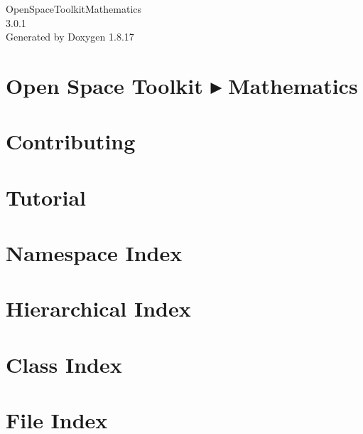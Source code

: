 \let\mypdfximage\pdfximage\def\pdfximage{\immediate\mypdfximage}\documentclass[twoside]{book}
\newcommand{\+}{\discretionary{\mbox{\scriptsize$\hookleftarrow$}}{}{}}
\newcommand{\clearemptydoublepage}{%
  \newpage{\pagestyle{empty}\cleardoublepage}%
}
\begin{document}
\hypersetup{pageanchor=false,
             bookmarksnumbered=true,
             pdfencoding=unicode
            }
\begin{titlepage}
\vspace*{7cm}
\begin{center}%
{\Large Open\+Space\+Toolkit\+Mathematics \\[1ex]\large 3.\+0.\+1 }\\
\vspace*{1cm}
{\large Generated by Doxygen 1.8.17}\\
\end{center}
\end{titlepage}
\clearemptydoublepage
{}
\tableofcontents
\clearemptydoublepage
{}
\hypersetup{pageanchor=true}

\chapter{Open Space Toolkit ▸ Mathematics}
\label{index}\hypertarget{index}{}
\chapter{Contributing}
\label{md__c_o_n_t_r_i_b_u_t_i_n_g}

\chapter{Tutorial}
\label{md_docs__tutorial}

\chapter{Namespace Index}

\chapter{Hierarchical Index}

\chapter{Class Index}

\chapter{File Index}

\end{document}
